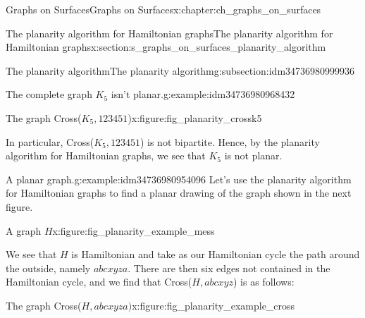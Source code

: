 \documentclass[oneside,10pt,]{book}
\numberwithin{equation}{section}
\begin{document}
\begin{chapterptx}{Graphs on Surfaces}{}{Graphs on Surfaces}{}{}{x:chapter:ch_graphs_on_surfaces}
\begin{sectionptx}{The planarity algorithm for Hamiltonian graphs}{}{The planarity algorithm for Hamiltonian graphs}{}{}{x:section:s_graphs_on_surfaces_planarity_algorithm}
\begin{subsectionptx}{The planarity algorithm}{}{The planarity algorithm}{}{}{g:subsection:idm34736980999936}
\begin{example}{The complete graph \(K_5\) isn't planar.}{g:example:idm34736980968432}
\begin{figureptx}{The graph Cross(\(K_5, 123451\))}{x:figure:fig_planarity_crossk5}{}
\begin{image}{0.15}{0.7}{0.15}
{\begin{tikzpicture}[scale=.7]
\end{tikzpicture}
}%
\end{image}%
\tcblower
\end{figureptx}%
In particular, Cross(\(K_5, 123451\)) is not bipartite.  Hence, by the planarity algorithm for Hamiltonian graphs, we see that \(K_5\) is not planar.%
\end{example}
\begin{example}{A planar graph.}{g:example:idm34736980954096}%
Let's use the planarity algorithm for Hamiltonian graphs to find a planar drawing of the graph shown in the next figure.%
\begin{figureptx}{A graph \(H\)}{x:figure:fig_planarity_example_mess}{}%
\begin{image}{0.15}{0.7}{0.15}%
%
\end{image}%
\tcblower
\end{figureptx}%
We see that \(H\) is Hamiltonian and take as our Hamiltonian cycle the path around the outside, namely \(abcxyza\).  There are then six edges not contained in the Hamiltonian cycle, and we find that Cross(\(H, abcxyz\)) is as follows:%
\begin{figureptx}{The graph Cross(\(H, abcxyza)\)}{x:figure:fig_planarity_example_cross}{}%
\begin{image}{0.15}{0.7}{0.15}%
\end{image}
\end{figureptx}
\end{example}
\end{subsectionptx}
\end{sectionptx}
\end{chapterptx}
\end{document}
